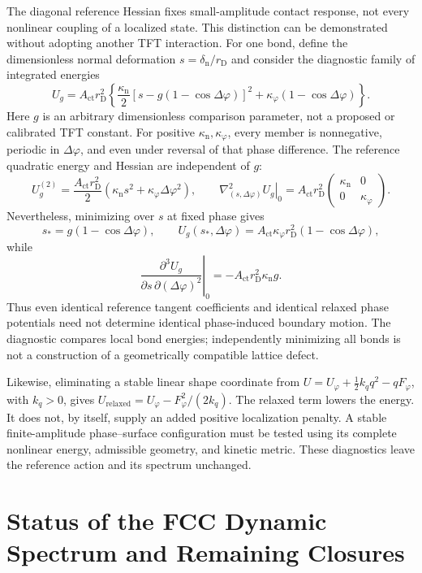 The diagonal reference Hessian fixes small-amplitude contact response, not every nonlinear coupling of a localized state. This distinction can be demonstrated without adopting another TFT interaction. For one bond, define the dimensionless normal deformation $s=\delta_{\mathrm n}/r_{\mathrm D}$ and consider the diagnostic family of integrated energies
\[
 U_g=A_{\mathrm{ct}}r_{\mathrm D}^{2}
 \left\{\frac{\kappa_{\mathrm n}}2
 \left[s-g(1-\cos\Delta\varphi)\right]^2
 +\kappa_\varphi(1-\cos\Delta\varphi)\right\}.
\]
Here $g$ is an arbitrary dimensionless comparison parameter, not a proposed or calibrated TFT constant. For positive $\kappa_{\mathrm n},\kappa_\varphi$, every member is nonnegative, periodic in $\Delta\varphi$, and even under reversal of that phase difference. The reference quadratic energy and Hessian are independent of $g$:
\[
 U_g^{(2)}=\frac{A_{\mathrm{ct}}r_{\mathrm D}^{2}}2
 (\kappa_{\mathrm n}s^2+\kappa_\varphi\Delta\varphi^2),
 \qquad
 \left.\nabla^2_{(s,\Delta\varphi)}U_g\right|_0
 =A_{\mathrm{ct}}r_{\mathrm D}^{2}
 \begin{pmatrix}\kappa_{\mathrm n}&0\\0&\kappa_\varphi\end{pmatrix}.
\]
Nevertheless, minimizing over $s$ at fixed phase gives
\[
 s_*=g(1-\cos\Delta\varphi),\qquad
 U_g(s_*,\Delta\varphi)
 =A_{\mathrm{ct}}\kappa_\varphi r_{\mathrm D}^{2}
 (1-\cos\Delta\varphi),
\]
while
\[
 \left.\frac{\partial^3 U_g}
 {\partial s\,\partial(\Delta\varphi)^2}\right|_0
 =-A_{\mathrm{ct}}r_{\mathrm D}^{2}\kappa_{\mathrm n}g.
\]
Thus even identical reference tangent coefficients and identical relaxed phase potentials need not determine identical phase-induced boundary motion. The diagnostic compares local bond energies; independently minimizing all bonds is not a construction of a geometrically compatible lattice defect.

Likewise, eliminating a stable linear shape coordinate from
$U=U_\varphi+\tfrac12 k_q q^2-qF_\varphi$, with $k_q>0$,
gives $U_{\mathrm{relaxed}}=U_\varphi-F_\varphi^2/(2k_q)$.
The relaxed term lowers the energy. It does not, by itself, supply an added positive localization penalty. A stable finite-amplitude phase--surface configuration must be tested using its complete nonlinear energy, admissible geometry, and kinetic metric. These diagnostics leave the reference action and its spectrum unchanged.

\section{Status of the FCC Dynamic Spectrum and Remaining Closures}

